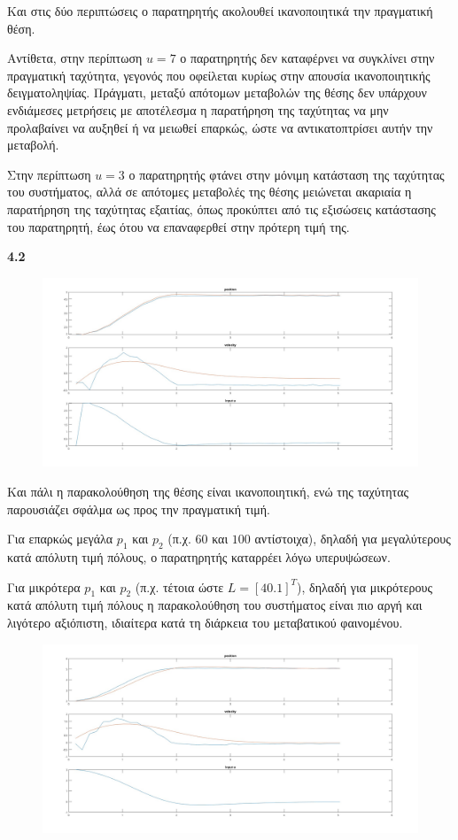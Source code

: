 \documentclass[12pt]{article}
\begin{document}
Και στις δύο περιπτώσεις ο παρατηρητής ακολουθεί ικανοποιητικά την πραγματική θέση. 

Αντίθετα, στην περίπτωση \(u = 7\) ο παρατηρητής δεν καταφέρνει να συγκλίνει στην πραγματική ταχύτητα, γεγονός που οφείλεται κυρίως στην απουσία ικανοποιητικής δειγματοληψίας. Πράγματι, μεταξύ απότομων μεταβολών της θέσης δεν υπάρχουν ενδιάμεσες μετρήσεις με αποτέλεσμα η παρατήρηση της ταχύτητας να μην προλαβαίνει να αυξηθεί ή να μειωθεί επαρκώς, ώστε να αντικατοπτρίσει αυτήν την μεταβολή. 

Στην περίπτωση \(u = 3\) ο παρατηρητής φτάνει στην μόνιμη κατάσταση της ταχύτητας του συστήματος, αλλά σε απότομες μεταβολές της θέσης μειώνεται ακαριαία η παρατήρηση της ταχύτητας εξαιτίας, όπως προκύπτει από τις εξισώσεις κατάστασης του παρατηρητή, έως ότου να επαναφερθεί στην πρότερη τιμή της.

\textbf{4.2}
\begin{figure}[H]
    \centering
    \includegraphics*[scale=0.25]{lab4b_all.jpg}
\end{figure}
Και πάλι η παρακολούθηση της θέσης είναι ικανοποιητική, ενώ της ταχύτητας παρουσιάζει σφάλμα ως προς την πραγματική τιμή. 

Για επαρκώς μεγάλα \(p_1 \) και \(p_2\) (π.χ. \(60\) και \(100\) αντίστοιχα), δηλαδή για μεγαλύτερους κατά απόλυτη τιμή πόλους, ο παρατηρητής καταρρέει λόγω υπερυψώσεων. 

Για μικρότερα \(p_1\) και \(p_2\) (π.χ. τέτοια ώστε \(L = [4 0.1]^T\)), δηλαδή για μικρότερους κατά απόλυτη τιμή πόλους η παρακολούθηση του συστήματος είναι πιο αργή και λιγότερο αξιόπιστη, ιδιαίτερα κατά τη διάρκεια του μεταβατικού φαινομένου. 
\begin{figure}[H]
    \centering
    \includegraphics*[scale=0.25]{lab4b_lowgains_all.jpg}
\end{figure}
\end{document}
